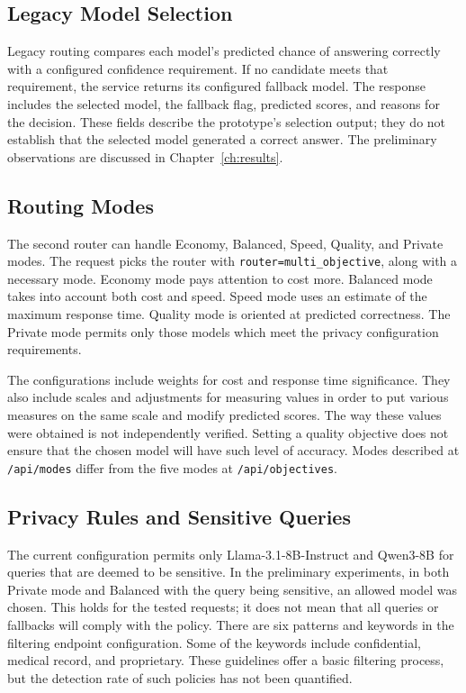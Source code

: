 \subsection{Legacy Model Selection}
Legacy routing compares each model's predicted chance of answering correctly with a configured confidence requirement. If no candidate meets that requirement, the service returns its configured fallback model. The response includes the selected model, the fallback flag, predicted scores, and reasons for the decision. These fields describe the prototype's selection output; they do not establish that the selected model generated a correct answer. The preliminary observations are discussed in Chapter~\ref{ch:results}.

\subsection{Routing Modes}
The second router can handle Economy, Balanced, Speed, Quality, and Private modes. The request picks the router with \texttt{router=multi\_objective}, along with a necessary mode. Economy mode pays attention to cost more. Balanced mode takes into account both cost and speed. Speed mode uses an estimate of the maximum response time. Quality mode is oriented at predicted correctness. The Private mode permits only those models which meet the privacy configuration requirements.

The configurations include weights for cost and response time significance. They also include scales and adjustments for measuring values in order to put various measures on the same scale and modify predicted scores. The way these values were obtained is not independently verified. Setting a quality objective does not ensure that the chosen model will have such level of accuracy. Modes described at \texttt{/api/modes} differ from the five modes at \texttt{/api/objectives}.

\subsection{Privacy Rules and Sensitive Queries}
The current configuration permits only Llama-3.1-8B-Instruct and Qwen3-8B for queries that are deemed to be sensitive. In the preliminary experiments, in both Private mode and Balanced with the query being sensitive, an allowed model was chosen. This holds for the tested requests; it does not mean that all queries or fallbacks will comply with the policy. There are six patterns and keywords in the filtering endpoint configuration. Some of the keywords include confidential, medical record, and proprietary. These guidelines offer a basic filtering process, but the detection rate of such policies has not been quantified.

